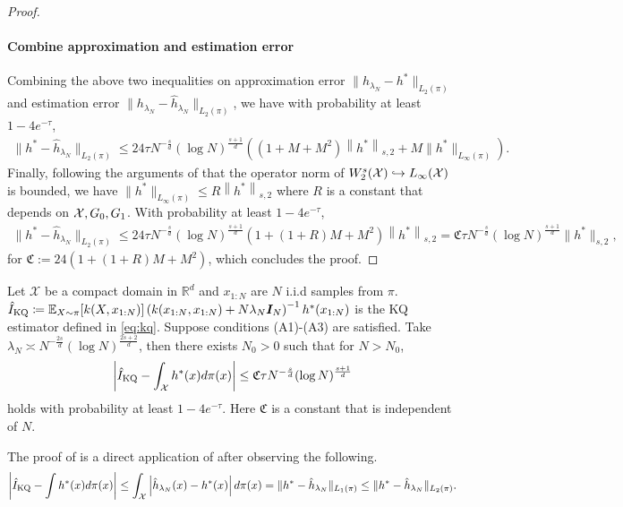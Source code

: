 \begin{proof}
\paragraph{Combine approximation and estimation error}
Combining the above two inequalities on approximation error $\| h_{\lambda_N} - h^\ast \|_{L_2(\pi)}$ and estimation error $\| h_{\lambda_N} - \hat{h}_{\lambda_N} \|_{L_2(\pi)}$, we have with probability at least $1 - 4e^{-\tau}$, 
\begin{align*}
    \| h^\ast - \hat{h}_{\lambda_N} \|_{L_2(\pi)} \leq 24 \tau N^{-\frac{s}{d}} (\log N)^{\frac{s+1}{d}} \left( (1 + M + M^2) \left\| h^\ast \right \|_{s,2} + M \|h^\ast \|_{L_\infty(\pi)} \right).
\end{align*}
Finally, following the arguments of  that the operator norm of $W_2^s(\mathcal{X}) \hookrightarrow L_\infty(\mathcal{X}) $ is bounded, we have $ \|h^\ast \|_{L_\infty(\pi)} \leq R \left\| h^\ast \right \|_{s,2}$ where $R$ is a constant that depends on $\mathcal{X}, G_0, G_1$. With probability at least $1 - 4e^{-\tau}$,
\begin{align*}
    \| h^\ast - \hat{h}_{\lambda_N} \|_{L_2(\pi)} \leq 24 \tau N^{-\frac{s}{d}} (\log N)^{\frac{s+1}{d}} (1 + (1 + R) M + M^2) \left\| h^\ast \right \|_{s,2}  = \mathfrak{C} \tau N^{-\frac{s}{d}} (\log N)^{\frac{s+1}{d}} \| h^\ast\|_{s,2},
\end{align*}
for $\mathfrak{C} := 24 (1 + (1 + R) M + M^2)$, which concludes the proof.
\end{proof}
\begin{cor}\label{cor:kq_rate}
    Let $\mathcal{X}$ be a compact domain in $\mathbb{R}^d$ and $x_{1:N}$ are $N$ i.i.d samples from $\pi$. 
    $\hat{I}_{\text{KQ}} \coloneq \operatorname{\mathbb{E}}_{X \sim \pi}[k(X, x_{1:N})] \left( k(x_{1:N}, x_{1:N}) + N \lambda_N \boldsymbol{I}_N \right)^{-1} h^\ast(x_{1:N})$ is the KQ estimator defined in \eqref{eq:kq}.
    Suppose conditions (A1)-(A3) are satisfied. Take $\lambda_N \asymp N^{-\frac{2 s}{d}} (\log N)^{\frac{2s+2}{d}}$, then there exists $N_0>0$ such that for $N > N_0$, 
    \begin{align}
    \left| \hat{I}_{\text{KQ}} - \int_{\mathcal{X}} h^\ast(x) d\pi(x) \right| \leq \mathfrak{C} \tau N^{-\frac{s}{d}} (\log N)^{\frac{s+1}{d}} 
    \end{align} 
holds with probability at least $1 - 4e^{-\tau}$. 
Here $\mathfrak{C}$ is a constant that is independent of $N$. 
\end{cor}
The proof of  is a direct application of  after observing the following.
\begin{align*}
    \left| \hat{I}_{\text{KQ}} - \int h^\ast(x) d\pi(x) \right| \leq \int_{\mathcal{X}} \left| \hat{h}_{\lambda_{N}}(x) - h^\ast(x) \right| d \pi(x) = \| h^\ast - \hat{h}_{\lambda_N} \|_{L_1(\pi)} \leq \| h^\ast - \hat{h}_{\lambda_N} \|_{L_2(\pi)} .
\end{align*}

